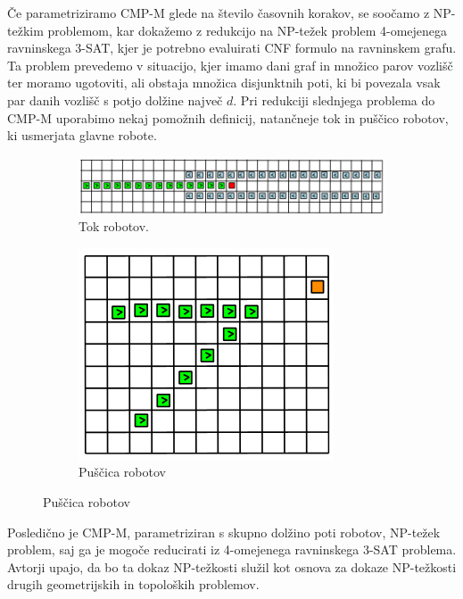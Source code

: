 \documentclass{article}
\begin{document}
Če parametriziramo CMP-M glede na število časovnih korakov, se soočamo z NP-težkim problemom, kar dokažemo z redukcijo na NP-težek problem 4-omejenega ravninskega 3-SAT, kjer je potrebno evaluirati CNF formulo na ravninskem grafu. Ta problem prevedemo v situacijo, kjer imamo dani graf in množico parov vozlišč ter moramo ugotoviti, ali obstaja množica disjunktnih poti, ki bi povezala vsak par danih vozlišč s potjo dolžine največ $d$. Pri redukciji slednjega problema do CMP-M uporabimo nekaj pomožnih definicij, natančneje tok in puščico robotov, ki usmerjata glavne robote.
\begin{figure}[h]
    \centering
    \begin{subfigure}{0.65\textwidth}
      \centering
      \includegraphics[width=\linewidth]{tok.png}
      \caption{Tok robotov.}
    \end{subfigure}\hfill
    \begin{subfigure}{0.25\textwidth}
      \centering
      \includegraphics[width=\linewidth]{puscica.png}
      \caption{Puščica robotov}
    \end{subfigure}
    \end{figure}

Posledično je CMP-M, parametriziran s skupno dolžino poti robotov, NP-težek problem, saj ga je mogoče reducirati iz 4-omejenega ravninskega 3-SAT problema. Avtorji upajo, da bo ta dokaz NP-težkosti služil kot osnova za dokaze NP-težkosti drugih geometrijskih in topoloških problemov.
\end{document}
